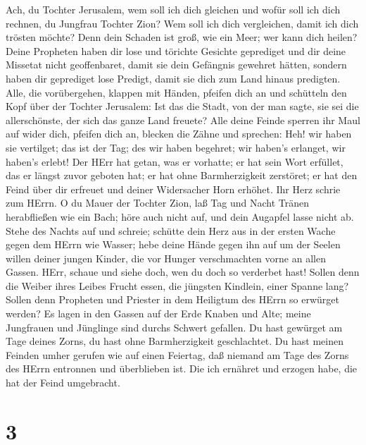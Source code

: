  Ach, du Tochter Jerusalem, wem soll ich dich gleichen und
wofür soll ich dich rechnen, du Jungfrau Tochter Zion? Wem soll ich dich
vergleichen, damit ich dich trösten möchte? Denn dein Schaden ist groß,
wie ein Meer; wer kann dich heilen?  Deine Propheten haben
dir lose und törichte Gesichte geprediget und dir deine Missetat nicht
geoffenbaret, damit sie dein Gefängnis gewehret hätten, sondern haben
dir geprediget lose Predigt, damit sie dich zum Land hinaus predigten.
 Alle, die vorübergehen, klappen mit Händen, pfeifen dich
an und schütteln den Kopf über der Tochter Jerusalem: Ist das die Stadt,
von der man sagte, sie sei die allerschönste, der sich das ganze Land
freuete?  Alle deine Feinde sperren ihr Maul auf wider
dich, pfeifen dich an, blecken die Zähne und sprechen: Heh! wir haben
sie vertilget; das ist der Tag; des wir haben begehret; wir haben's
erlanget, wir haben's erlebt!  Der HErr hat getan, was er
vorhatte; er hat sein Wort erfüllet, das er längst zuvor geboten hat; er
hat ohne Barmherzigkeit zerstöret; er hat den Feind über dir erfreuet
und deiner Widersacher Horn erhöhet.  Ihr Herz schrie zum
HErrn. O du Mauer der Tochter Zion, laß Tag und Nacht Tränen
herabfließen wie ein Bach; höre auch nicht auf, und dein Augapfel lasse
nicht ab.  Stehe des Nachts auf und schreie; schütte dein
Herz aus in der ersten Wache gegen dem HErrn wie Wasser; hebe deine
Hände gegen ihn auf um der Seelen willen deiner jungen Kinder, die vor
Hunger verschmachten vorne an allen Gassen.  HErr, schaue
und siehe doch, wen du doch so verderbet hast! Sollen denn die Weiber
ihres Leibes Frucht essen, die jüngsten Kindlein, einer Spanne lang?
Sollen denn Propheten und Priester in dem Heiligtum des HErrn so
erwürget werden?  Es lagen in den Gassen auf der Erde
Knaben und Alte; meine Jungfrauen und Jünglinge sind durchs Schwert
gefallen. Du hast gewürget am Tage deines Zorns, du hast ohne
Barmherzigkeit geschlachtet.  Du hast meinen Feinden umher
gerufen wie auf einen Feiertag, daß niemand am Tage des Zorns des HErrn
entronnen und überblieben ist. Die ich ernähret und erzogen habe, die
hat der Feind umgebracht.

\hypertarget{section-2}{%
\section{3}\label{section-2}}


